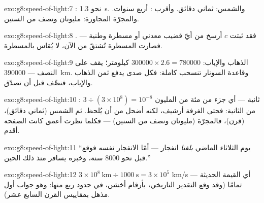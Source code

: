 \begin{solution}{exo:g8:speed-of-light:7}
: نحو \qty{1.3}{s}. والشمس: ثماني دقائق. وأقرب : أربع
سنوات. والمجرّة المجاورة: مليونان ونصف من السنين.
\end{solution}

\begin{solution}{exo:g8:speed-of-light:8}
. فقد ثبتت  $c$ أرسخ من أيّ قضيب معدني أو مسطرة
وطنية --- فصارت المسطرة تُشتقّ من  الآن، لا  يُقاس
بالمسطرة.
\end{solution}

\begin{solution}{exo:g8:speed-of-light:9}
الذهاب والإياب: $300000 \times 2.6 = 780000$ كيلومتر؛ 
يقف على النصف --- \qty{390000}{km}. وقاعدة السونار تنسحب
كاملة: فكل صدى يدفع ثمن الذهاب والإياب، فنصِّف قبل أن تصدّق.
\end{solution}

\begin{solution}{exo:g8:speed-of-light:10}
: $3 \div (3 \times 10^{8}) = 10^{-8}$ ثانية --- أي
جزء من مئة من المليون من الثانية: فحتى الغرفة أرشيف، لكنه
أضحل من أن يُلحظ. ثم الشمس (ثماني دقائق)،  (قرن)،
فالمجرّة (مليونان ونصف من السنين) --- فكلما نظرت أعمق كانت
الصفحة أقدم.
\end{solution}

\begin{solution}{exo:g8:speed-of-light:11}
``يوم الثلاثاء الماضي \emph{بلغنا}  انفجار  --- أمّا
الانفجار نفسه فوقع قبل نحو $8000$ سنة، وخبره يسافر منذ
ذلك الحين.''
\end{solution}

\begin{solution}{exo:g8:speed-of-light:12}
$3 \times 10^{8}\ \text{km} \div 1000\ \text{s} = 3 \times
10^{5}$ \unit{km/s} --- أي القيمة الحديثة تمامًا (وقد وقع
التقدير التاريخي، بأرقام  أخشن، في حدود ربع منها: وهو
جواب أول مذهل بمقاييس القرن السابع عشر).
\end{solution}

